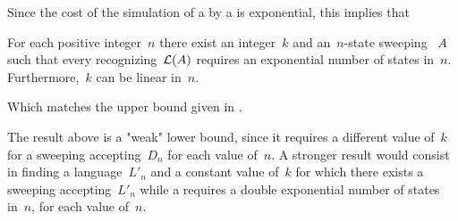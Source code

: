 Since the cost of the simulation of a \ONFA by a \ODFA is exponential, this implies that

\begin{coro}
	For each positive integer~$n$ there exist an integer~$k$ and an~$n$-state sweeping \kDLA~$A$ such that every \ONFA recognizing~$\mathcal L(A)$ requires an exponential number of states in~$n$.
	Furthermore,~$k$ can be linear in~$n$.
\end{coro}

Which matches the upper bound given in .

The result above is a "weak" lower bound, since it requires a different value of~$k$ for a sweeping \kDLA accepting~$D_n$ for each value of~$n$.%
A stronger result would consist in finding a language~$L'_n$ and a constant value of~$k$ for which there exists a sweeping \kDLA accepting~$L'_n$ while a \ODFA requires a double exponential number of states in~$n$, for each value of~$n$.
